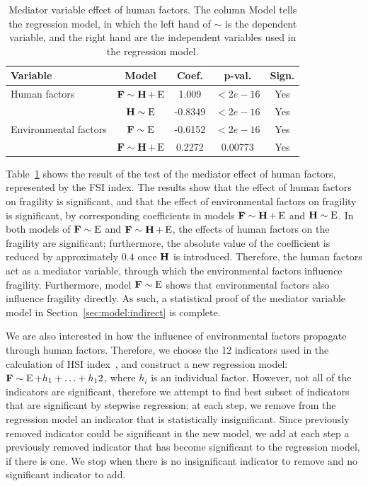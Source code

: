 {\begin{table}[htbp]
    \centering
    \begin{tabular}{|l|cccc|} \hline
        Variable & Model & Coef. & p-val. & Sign.  \\ \hline
        Human factors & $\operatorname*{\mathbf{F}}\sim\operatorname*{\mathbf{H}} + \operatorname*{E}$ & 1.009 & $<2e-16$ & Yes  \\ \hline        
        \multirow{3}{*}{Environmental factors} & $\operatorname*{\mathbf{H}}\sim\operatorname*{E}$ & -0.8349 & $<2e-16$ & Yes \\ \cline{2-5}
        & $\operatorname*{\mathbf{F}}\sim\operatorname*{E}$ & -0.6152 & $<2e-16$ & Yes \\ \cline{2-5}
        & $\operatorname*{\mathbf{F}}\sim\operatorname*{\mathbf{H}}+\operatorname*{E}$ & 0.2272 & 0.00773 & Yes \\ \hline        
    \end{tabular}
    \caption{Mediator variable effect of human factors. The column Model tells the regression model, in which the left hand of $\sim$ is the dependent variable, and the right hand are the independent variables used in the regression model.}
    \label{tab:exp:mediator:general}
\end{table}
    
Table~\ref{tab:exp:mediator:general} shows the result of the test of the mediator effect of human factors, represented by the FSI index. The results show that the effect of human factors on fragility is significant, and that the effect of environmental factors on fragility is significant, by corresponding coefficients in models $\operatorname*{\mathbf{F}}\sim\operatorname*{\mathbf{H}}+\operatorname*{E}$ and $\operatorname*{\mathbf{H}}\sim\operatorname*{E}$. In both models of $\operatorname*{\mathbf{F}}\sim\operatorname*{E}$ and $\operatorname*{\mathbf{F}}\sim\operatorname*{\mathbf{H}}+\operatorname*{E}$, the effects of human factors on the fragility are significant; furthermore, the absolute value of the coefficient is reduced by approximately $0.4$ once $\operatorname*{\mathbf{H}}$ is introduced. Therefore, the human factors act as a mediator variable, through which the environmental factors influence fragility. Furthermore, model $\operatorname*{\mathbf{F}}\sim\operatorname*{E}$ shows that environmental factors also influence fragility directly. As such, a statistical proof of the mediator variable model in Section~\ref{sec:model:indirect} is complete.

We are also interested in how the influence of environmental factors propagate through human factors. Therefore, we choose the 12 indicators used in the calculation of HSI index~, and construct a new regression model: $\operatorname*{\mathbf{F}}\sim\operatorname*{E}+h_1+\ldots+h_12$, where $h_i$ is an individual factor. However, not all of the indicators are significant, therefore we attempt to find best subset of indicators that are significant by stepwise regression: at each step, we remove from the regression model an indicator that is statistically insignificant. Since previously removed indicator could be significant in the new model, we add at each step a previously removed indicator that has become significant to the regression model, if there is one. We stop when there is no insignificant indicator to remove and no significant indicator to add. 

}
